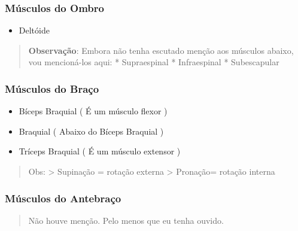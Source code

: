 \documentclass[
]{book}
\providecommand{\tightlist}{%
  \setlength{\itemsep}{0pt}\setlength{\parskip}{0pt}}
\begin{document}
\begin{longtable}[]{@{}
  >{\centering\arraybackslash}p{}
  >{\centering\arraybackslash}p{}@{}}
\toprule()
\endhead
\bottomrule()
\end{longtable}

\hypertarget{muxfasculos-do-ombro}{%
\subsubsection{Músculos do Ombro}\label{muxfasculos-do-ombro}}

\begin{itemize}
\tightlist
\item
  Deltóide
\end{itemize}

\begin{quote}
\textbf{Observação}: Embora não tenha escutado menção aos músculos abaixo, vou mencioná-los aqui:
* Supraespinal
* Infraespinal
* Subescapular
\end{quote}

\hypertarget{muxfasculos-do-brauxe7o-1}{%
\subsubsection{Músculos do Braço}\label{muxfasculos-do-brauxe7o-1}}

\begin{itemize}
\tightlist
\item
  Bíceps Braquial ( É um músculo flexor )
\item
  Braquial ( Abaixo do Bíceps Braquial )
\item
  Tríceps Braquial ( É um músculo extensor )
\end{itemize}

\begin{quote}
Obs:
\textgreater{} Supinação = rotação externa
\textgreater{} Pronação= rotação interna
\end{quote}

\hypertarget{muxfasculos-do-antebrauxe7o}{%
\subsubsection{Músculos do Antebraço}\label{muxfasculos-do-antebrauxe7o}}

\begin{quote}
Não houve menção. Pelo menos que eu tenha ouvido.
\end{quote}
\end{document}
